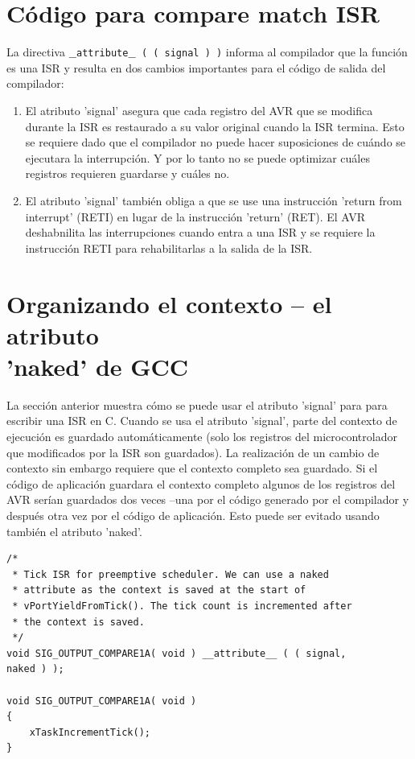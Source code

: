 \documentclass[12pt]{article}
\begin{document}
\section{Código para compare match ISR}
La directiva {\tt $\_\_$attribute$\_\_$ ( ( signal ) )} informa al 
compilador que la función es una ISR y resulta en dos cambios 
importantes para el código de salida del compilador:
\begin{enumerate}
\item El atributo 'signal' asegura que cada registro del AVR que se 
modifica durante la ISR es restaurado a su valor original cuando la ISR 
termina. Esto se requiere dado que el compilador no puede hacer 
suposiciones de cuándo se ejecutara la interrupción. Y por lo tanto no 
se puede optimizar cuáles registros requieren guardarse y cuáles no.
\item El atributo 'signal' también obliga a que se use una instrucción 
'return from interrupt' (RETI) en lugar de la instrucción 'return' (RET). 
El AVR deshabnilita las interrupciones cuando entra a una ISR y se 
requiere la instrucción RETI para rehabilitarlas a la salida de la ISR.
\end{enumerate}
\section{Organizando el contexto -- el atributo \\'naked' de GCC}
La sección anterior muestra cómo se puede usar el atributo 'signal' para 
para escribir una ISR en C. Cuando se usa el atributo 'signal', parte 
del contexto de ejecución es guardado automáticamente (solo los 
registros del microcontrolador que modificados por la ISR son guardados). 
La realización de un cambio de contexto sin embargo requiere que el 
contexto completo sea guardado. Si el código de aplicación guardara el 
contexto completo algunos de los registros del AVR serían guardados dos 
veces --una por el código generado por el compilador y después otra vez 
por el código de aplicación. Esto puede ser evitado  usando también el 
atributo 'naked'.
\begin{verbatim}
/*
 * Tick ISR for preemptive scheduler. We can use a naked 
 * attribute as the context is saved at the start of 
 * vPortYieldFromTick(). The tick count is incremented after 
 * the context is saved.
 */
void SIG_OUTPUT_COMPARE1A( void ) __attribute__ ( ( signal, 
naked ) );

void SIG_OUTPUT_COMPARE1A( void )
{
    xTaskIncrementTick();
}
\end{verbatim}
\end{document}
